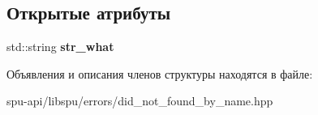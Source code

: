 \subsection*{Открытые атрибуты}
\begin{DoxyCompactItemize}
\item 
\mbox{\label{struct_s_p_u_1_1_did_not_found_data_by_name_a7f80657f0a0fd12a4b7705d5128067bc}} 
std\+::string {\bfseries str\+\_\+what}
\end{DoxyCompactItemize}


Объявления и описания членов структуры находятся в файле\+:\begin{DoxyCompactItemize}
\item 
spu-\/api/libspu/errors/did\+\_\+not\+\_\+found\+\_\+by\+\_\+name.\+hpp\end{DoxyCompactItemize}
